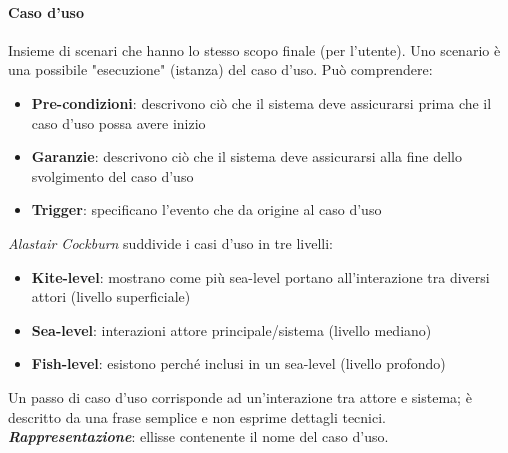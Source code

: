 \paragraph{Caso d'uso} Insieme di scenari che hanno lo stesso scopo finale (per l'utente). Uno scenario è una possibile "esecuzione" (istanza) del caso d'uso. Può comprendere:
\begin{itemize}
    \item \textbf{Pre-condizioni}: descrivono ciò che il sistema deve assicurarsi prima che il caso d'uso possa avere inizio
    \item \textbf{Garanzie}: descrivono ciò che il sistema deve assicurarsi alla fine dello svolgimento del caso d'uso
    \item \textbf{Trigger}: specificano l'evento che da origine al caso d'uso
\end{itemize}
\textit{Alastair Cockburn} suddivide i casi d'uso in tre livelli:
\begin{itemize}
    \item \textbf{Kite-level}: mostrano come più sea-level portano all'interazione tra diversi attori (livello superficiale)
    \item \textbf{Sea-level}: interazioni attore principale/sistema (livello mediano)
    \item \textbf{Fish-level}: esistono perché inclusi in un sea-level (livello profondo)
\end{itemize}
Un passo di caso d'uso corrisponde ad un'interazione tra attore e sistema; è descritto da una frase semplice e non esprime dettagli tecnici.\\
\textbf{\textit{Rappresentazione}}: ellisse contenente il nome del caso d'uso.

\begin{figure}[h!]
  \centering
  \hfill
\end{figure}

